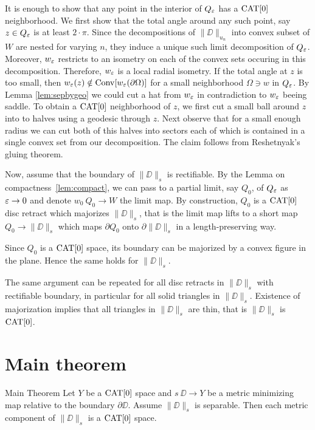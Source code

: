 \documentclass{article}
\begin{document}
It is enough to show that any point in the interior of $Q_\varepsilon$ has a $\mathop{\rm CAT}\nolimits[0]$ neighborhood.
We first show that the total angle around any such point, say $z\in Q_\varepsilon$ is at least $2\cdot\pi$.
Since the decompositions of $\|\DD\|_{u_n}$ into convex subset of $W$ are nested for varying $n$, they
induce a unique such limit decomposition of $Q_\varepsilon$.
Moreover, $w_\varepsilon$ restricts to an isometry on each 
of the convex sets occuring in this decomposition.
Therefore, $w_\varepsilon$ is a local radial isometry.
If the total angle at $z$ is too small, then $w_\varepsilon(z)\notin\mathop{\rm Conv}\nolimits [w_\varepsilon (\partial\Omega)]$
for a small neighborhood $\Omega\ni w$ in $Q_\varepsilon$. 
By Lemma \ref{lem:sepbygeo} we could cut a hat from $w_\varepsilon$
in contradiction to $w_\varepsilon$ beeing saddle.
To obtain a $\mathop{\rm CAT}\nolimits[0]$ neighborhood of $z$, we first cut a small ball around $z$ into to halves using a geodesic through $z$.
Next observe that for a small enough radius we can cut both of this halves into sectors each of which is contained in a single convex set
from our decomposition.
The claim follows from Reshetnyak's gluing theorem.
\qeds


Now, assume that the boundary of $\|\DD\|_s$ is rectifiable.
By the Lemma on compactness~\ref{lem:compact},
we can pass to a partial limit, say $Q_0$, of $Q_\varepsilon$ as $\varepsilon\to 0$ and denote $w_0\:Q_0\to W$ the limit map.
By construction, $Q_0$ is a $\mathop{\rm CAT}\nolimits[0]$ disc retract which majorizes $\|\DD\|_s$,
that is the limit map lifts to a short map $Q_0\to \|\DD\|_s$ which maps $\partial Q_0$ onto  $\partial \|\DD\|_s$ in a length-preserving way.

Since $Q_0$ is a $\mathop{\rm CAT}\nolimits[0]$ space, its boundary can be majorized by a convex figure in the plane.
Hence the same holds for $\|\DD\|_s$.

The same argument can be repeated for all disc retracts in $\|\DD\|_s$ with rectifiable boundary, in particular for all solid triangles in $\|\DD\|_s$.
Existence of majorization implies that all triangles in $\|\DD\|_s$ are thin, that is $\|\DD\|_s$ is $\mathop{\rm CAT}\nolimits[0]$.
\qeds

\section{Main theorem}\label{Main theorem}

\begin{thm}{Main Theorem}\label{thm:main}
Let $Y$ be a $\mathop{\rm CAT}\nolimits[0]$ space 
and $s\:\DD\to Y$ be a metric minimizing map relative to the boundary $\partial\DD$.
Assume $\|\DD\|_s$  is separable. 
Then each metric component of $\|\DD\|_s$ is a $\mathop{\rm CAT}\nolimits[0]$ space. 
\end{thm}
\end{document}
